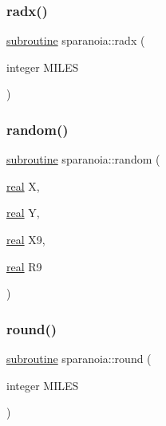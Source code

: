 \subsubsection{\texorpdfstring{radx()}{radx()}}
{\footnotesize\ttfamily \hyperlink{M__stopwatch_83_8txt_acfbcff50169d691ff02d4a123ed70482}{subroutine} sparanoia\+::radx (\begin{DoxyParamCaption}\item[{integer}]{M\+I\+L\+ES }\end{DoxyParamCaption})}

\mbox{\label{sparanoia_8f90_ae429b4770ec5b607af3fbc27e8e02ccc}} 
\subsubsection{\texorpdfstring{random()}{random()}}
{\footnotesize\ttfamily \hyperlink{M__stopwatch_83_8txt_acfbcff50169d691ff02d4a123ed70482}{subroutine} sparanoia\+::random (\begin{DoxyParamCaption}\item[{\hyperlink{read__watch_83_8txt_abdb62bde002f38ef75f810d3a905a823}{real}}]{X,  }\item[{\hyperlink{read__watch_83_8txt_abdb62bde002f38ef75f810d3a905a823}{real}}]{Y,  }\item[{\hyperlink{read__watch_83_8txt_abdb62bde002f38ef75f810d3a905a823}{real}}]{X9,  }\item[{\hyperlink{read__watch_83_8txt_abdb62bde002f38ef75f810d3a905a823}{real}}]{R9 }\end{DoxyParamCaption})}

\mbox{\label{sparanoia_8f90_ada89e3fa6290059b6cb40cf8c8df33b7}} 
\subsubsection{\texorpdfstring{round()}{round()}}
{\footnotesize\ttfamily \hyperlink{M__stopwatch_83_8txt_acfbcff50169d691ff02d4a123ed70482}{subroutine} sparanoia\+::round (\begin{DoxyParamCaption}\item[{integer}]{M\+I\+L\+ES }\end{DoxyParamCaption})}

